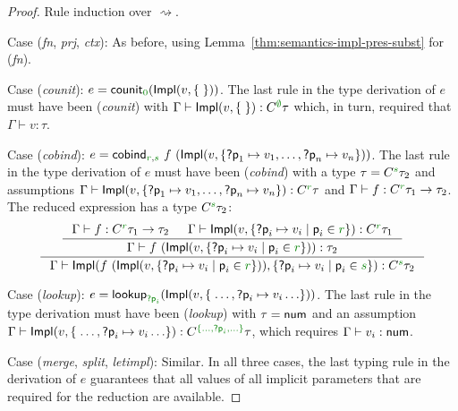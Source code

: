 \begin{proof}
  Rule induction over $\rightsquigarrow$.

\vspace{0.25em}\noindent\hangindent=0.6cm
Case (\emph{fn}, \emph{prj}, \emph{ctx}): As before, using Lemma~\ref{thm:semantics-impl-pres-subst} for (\emph{fn}).

\vspace{0.25em}\noindent\hangindent=0.6cm
Case (\emph{counit}): $e = \ident{counit}_{\cclrd{0}}(\ident{Impl}(v, \{\;\}))$. The last rule in the type
  derivation of $e$ must have been (\emph{counit}) with $\Gamma \vdash \ident{Impl}(v, \{ \; \}) : \ctyp{\cclrd{\emptyset}}\tau$
  which, in turn, required that $\Gamma \vdash v : \tau$.

\vspace{0.25em}\noindent\hangindent=0.6cm
Case (\emph{cobind}): $e = \ident{cobind}_{\cclrd{r}, \cclrd{s}}~f~(\ident{Impl}(v, \{ \ident{?p}_1\mapsto v_1, \ldots, \ident{?p}_n\mapsto v_n  \}))$.
  The last rule in the type derivation of $e$ must have been (\emph{cobind}) with a type $\tau = \ctyp{\cclrd{s}}\tau_2$ and assumptions
  $\Gamma \vdash \ident{Impl}(v, \{ \ident{?p}_1\mapsto v_1, \ldots, \ident{?p}_n\mapsto v_n  \}) : \ctyp{\cclrd{r}}{\tau}$ and
  $\Gamma \vdash f : \ctyp{\cclrd{r}}{\tau_1} \rightarrow \tau_2$.
  The reduced expression has a type $\ctyp{\cclrd{s}}\tau_2$:
\begin{equation*}
\inference
  { \inference
      { \Gamma \vdash f : \ctyp{\cclrd{r}}{\tau_1} \rightarrow \tau_2 &
        \Gamma \vdash \ident{Impl}(v, \{ \ident{?p}_i \mapsto v_i \;|\; \ident{p}_i \in \cclrd{r} \} ) :  \ctyp{\cclrd{r}}{\tau_1}}
      { \Gamma \vdash f~(\ident{Impl}(v, \{ \ident{?p}_i \mapsto v_i \;|\; \ident{p}_i \in \cclrd{r} \} )) : \tau_2} }
  { \Gamma \vdash \ident{Impl}(f~(\ident{Impl}(v, \{ \ident{?p}_i \mapsto v_i \;|\; \ident{p}_i \in \cclrd{r} \} )), \{ \ident{?p}_i \mapsto v_i \;|\; \ident{p}_i \in \cclrd{s} \}) : \ctyp{\cclrd{s}}\tau_2 }
\end{equation*}

\vspace{0.25em}\noindent\hangindent=0.6cm
Case (\emph{lookup}): $e = \ident{lookup}_{\cclrd{\ident{?p}_i}}(\ident{Impl}(v, \{\; \ldots, \ident{?p}_i \mapsto v_i \ldots \}))$. The last rule in the type
  derivation must have been (\emph{lookup}) with $\tau = \ident{num}$ and an assumption $\Gamma\vdash\ident{Impl}(v, \{\; \ldots, \ident{?p}_i\mapsto v_i \ldots \}) : \ctyp{\cclrd{ \{\ldots,\ident{?p}_i,\ldots\} }}{\tau}$,
  which requires $\Gamma \vdash v_i : \textnormal{\sffamily num}$.

\vspace{0.25em}\noindent\hangindent=0.6cm
Case (\emph{merge}, \emph{split}, \emph{letimpl}): Similar. In all three cases, the last typing rule in the derivation of $e$
  guarantees that all values of all implicit parameters that are required for the reduction are available.
\end{proof}

